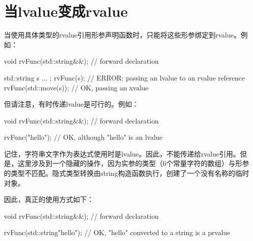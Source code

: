 \section{当lvalue变成rvalue}
当使用具体类型的rvalue引用形参声明函数时，只能将这些形参绑定到rvalue。例如：

\begin{cppcode}
void rvFunc(std::string&&); // forward declaration

std::string s{ ... };
rvFunc(s); // ERROR: passing an lvalue to an rvalue reference
rvFunc(std::move(s)); // OK, passing an xvalue
\end{cppcode}

但请注意，有时传递lvalue是可行的。例如：

\begin{cppcode}
void rvFunc(std::string&&); // forward declaration

rvFunc("hello"); // OK, although "hello" is an lvalue
\end{cppcode}

记住，字符串文字作为表达式使用时是lvalue。因此，不能传递给rvalue引用。但是，这里涉及到一个隐藏的操作，因为实参的类型（6个常量字符的数组）与形参的类型不匹配。隐式类型转换由string构造函数执行，创建了一个没有名称的临时对象。

因此，真正的使用方式如下：

\begin{cppcode}
void rvFunc(std::string&&); // forward declaration

rvFunc(std::string{"hello"}); // OK, "hello" converted to a string is a prvalue
\end{cppcode}






























































